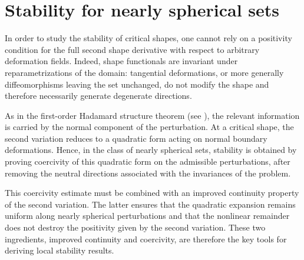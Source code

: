 \documentclass[oneside,a4paper,11pt,notitlepage]{article}
\theoremstyle{definition}
\theoremstyle{plain}
\theoremstyle{definition}
\begin{document}
\section{Stability for nearly spherical sets}\label{stability}
In order to study the stability of critical shapes, one cannot rely on a positivity condition for the full second shape derivative with respect to arbitrary deformation fields. Indeed, shape functionals are invariant under reparametrizations of the domain: tangential deformations, or more generally diffeomorphisms leaving the set unchanged, do not modify the shape and therefore necessarily generate degenerate directions.

As in the first-order Hadamard structure theorem (see \cite{DL}), the relevant information is carried by the normal component of the perturbation. At a critical shape, the second variation reduces to a quadratic form acting on normal boundary deformations. Hence, in the class of nearly spherical sets, stability is obtained by proving coercivity of this quadratic form on the admissible perturbations, after removing the neutral directions associated with the invariances of the problem.

This coercivity estimate must be combined with an improved continuity property of the second variation. The latter ensures that the quadratic expansion remains uniform along nearly spherical perturbations and that the nonlinear remainder does not destroy the positivity given by the second variation. These two ingredients, improved continuity and coercivity, are therefore the key tools for deriving local stability results.
\end{document}
